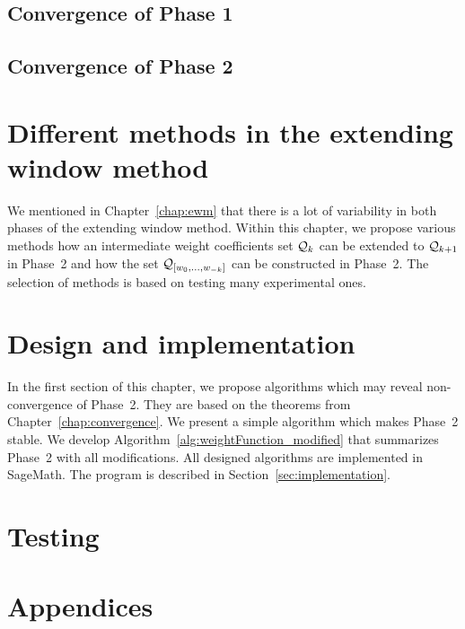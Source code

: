 \documentclass[11pt,a4paper]{report}	%
\theoremstyle{definition}
\begin{document}
	\section{Convergence of Phase 1}
	

	\section{Convergence of Phase 2}
	
	

	


\chapter{Different methods in the extending window method}
	\label{chap:diffChoices}
	We mentioned in Chapter~\ref{chap:ewm} that there is a lot of variability in both phases of the extending window method. Within this chapter, we propose various methods how an intermediate weight coefficients set $\mathcal{Q}_k$ can be extended to $\mathcal{Q}_{k+1}$ in Phase~2 and how the set $\mathcal{Q}_{[w_{0}, \dots, w_{-k}]}$ can be constructed in Phase~2. The selection of methods is based on testing many experimental ones. 

	

	

	
	


\chapter{Design and implementation}

In the first section of this chapter, we propose algorithms which may reveal non-convergence of Phase~2. They are based on the theorems from Chapter~\ref{chap:convergence}. We present a simple algorithm which makes Phase~2 stable. We develop Algorithm~\ref{alg:weightFunction_modified} that summarizes  Phase~2 with all modifications. All designed algorithms are implemented in SageMath. The program is described in Section~\ref{sec:implementation}.
\label{chap:design}
	
	

\chapter{Testing}
	

\newpage



\appendix
\chapter*{Appendices}
\renewcommand{\thesection}{\Alph{section}}

\end{document}
